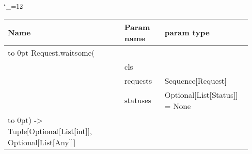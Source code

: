 \begingroup \catcode`\_=12 \tt
\begin{tabular}{lll}
\toprule
\textrm{Name}&\textrm{Param name}&\textrm{param type}\\
\midrule
\hbox to 0pt {Request.waitsome(\hss}\\
& cls\\
& requests & Sequence[Request]\\
& statuses & Optional[List[Status]] = None\\
\hbox to 0pt{) -> Tuple[Optional[List[int]], Optional[List[Any]]]\hss}\\
\bottomrule
\end{tabular}
\endgroup
